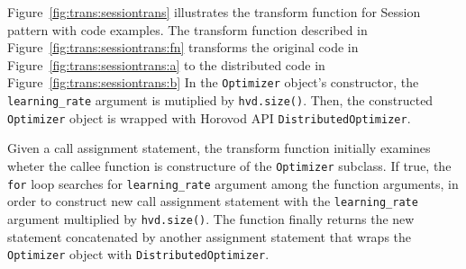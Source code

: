 \noindent

\begin{inred}
Figure~\ref{fig:trans:sessiontrans} illustrates the transform function for
Session pattern with code examples.
The transform function described in Figure~\ref{fig:trans:sessiontrans:fn}
transforms the original code in Figure~\ref{fig:trans:sessiontrans:a} to
the distributed code in Figure~\ref{fig:trans:sessiontrans:b}
In the {\tt Optimizer} object's constructor,
the {\tt learning\_rate} argument is mutiplied by {\tt hvd.size()}.
Then, the constructed {\tt Optimizer} object
is wrapped with Horovod API {\tt DistributedOptimizer}.

Given a call assignment statement,
the transform function initially examines wheter the callee function
is constructure of the {\tt Optimizer} subclass.
If true, the {\tt for} loop searches for
{\tt learning\_rate} argument among the function arguments,
in order to construct new call assignment statement 
with the {\tt learning\_rate} argument multiplied by {\tt hvd.size()}.
The function finally returns the new statement
concatenated by another assignment statement
that wraps the {\tt Optimizer} object with {\tt DistributedOptimizer}.

\end{inred}



